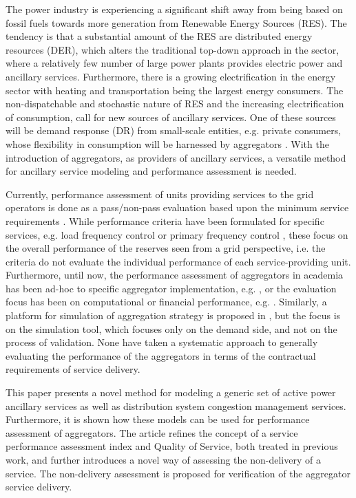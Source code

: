 The power industry is experiencing a significant shift away from being based on fossil fuels towards more generation from Renewable Energy Sources (RES). The tendency is that a substantial amount of the RES are distributed energy resources (DER), which alters the traditional top-down approach in the sector, where a relatively few number of large power plants provides electric power and ancillary services. Furthermore, there is a growing electrification in the energy sector with heating and transportation being the largest energy consumers. The non-dispatchable and stochastic nature of RES and the increasing electrification of consumption, call for new sources of ancillary services. One of these sources will be demand response (DR) from small-scale entities, e.g. private consumers, whose flexibility in consumption will be harnessed by aggregators \cite{pudjianto2007virtual}. With the introduction of aggregators, as providers of ancillary services, a versatile method for ancillary service modeling and performance assessment is needed.

Currently, performance assessment of units providing services to the grid operators is done as a pass/non-pass evaluation based upon the minimum service requirements \cite{EnerginetAncillary}. While performance criteria have been formulated for specific services, e.g. load frequency control \cite{gross2001analysis} or primary frequency control \cite{eto2010use}, these focus on the overall performance of the reserves seen from a grid perspective, i.e. the criteria do not evaluate the individual performance of each service-providing unit. Furthermore, until now, the performance assessment of aggregators in academia has been ad-hoc to specific aggregator implementation, e.g. \cite{vrettos2015integrating}, or the evaluation focus has been on computational or financial performance, e.g. \cite{su2012performance,rahnama2014evaluation}. Similarly, a platform for simulation of aggregation strategy is proposed in \cite{dittawit2014demand}, but the focus is on the simulation tool, which focuses only on the demand side, and not on the process of validation. None have taken a systematic approach to generally evaluating the performance of the aggregators in terms of the contractual requirements of service delivery. 

This paper presents a novel method for modeling a generic set of active power ancillary services as well as distribution system congestion management services. Furthermore, it is shown how these models can be used for performance assessment of aggregators. The article refines the concept of a service performance assessment index and Quality of Service, both treated in previous work, and further introduces a novel way of assessing the non-delivery of a service. The non-delivery assessment is proposed for verification of the aggregator service delivery.

